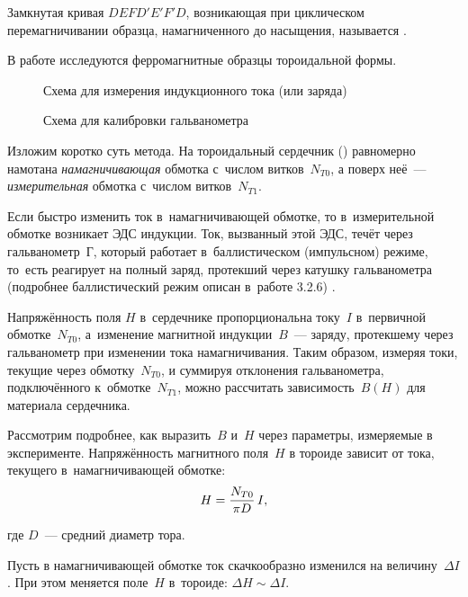 Замкнутая кривая $DEFD'E'F'D$, возникающая при циклическом перемагничивании образца, намагниченного до насыщения,
называется .

В работе исследуются ферромагнитные образцы тороидальной формы.

\begin{figure}
	\centering
	\begin{minipage}{.48\textwidth}
		\caption{Схема для измерения индукционного тока (или заряда)}
	\end{minipage}
	\begin{minipage}{.48\textwidth}
		\caption{Схема для калибровки гальванометра}
	\end{minipage}
\end{figure}

Изложим коротко суть метода. На тороидальный сердечник () равномерно намотана \emph{намагничивающая} обмотка
с~числом витков~$N_{T0}$, а поверх неё~--- \emph{измерительная} обмотка с~числом витков~$N_{T1}$.

Если быстро изменить ток в~намагничивающей обмотке, то в~измерительной обмотке возникает ЭДС индукции. Ток, вызванный
этой ЭДС, течёт через гальванометр~Г, который работает в~баллистическом (импульсном) режиме, то~есть реагирует на полный
заряд, протекший через катушку гальванометра (подробнее баллистический режим описан в~работе 3.2.6) .

Напряжённость поля $H$ в~сердечнике пропорциональна току~$I$ в~первичной обмотке~$N_{T0}$, а~изменение магнитной
индукции~$B$~--- заряду, протекшему через гальванометр при изменении тока намагничивания. Таким образом, измеряя токи,
текущие через обмотку~$N_{T0}$, и суммируя отклонения гальванометра, подключённого к~обмотке~$N_{T1}$, можно рассчитать
зависимость~$B(H)$ для материала сердечника.

Рассмотрим подробнее, как выразить~$B$ и~$H$ через параметры, измеряемые в эксперименте. Напряжённость магнитного
поля~$H$ в тороиде зависит от тока, текущего в~намагничивающей обмотке:
\begin{equation}
	\eqmark{2}
	H=\frac{N_{T0}}{\pi D}\,I,
\end{equation}

где $D$~--- средний диаметр тора.

Пусть в намагничивающей обмотке ток скачкообразно изменился на величину~$\Delta I$. При этом меняется поле~$H$ в~тороиде:
$\Delta H\sim\Delta I$.

